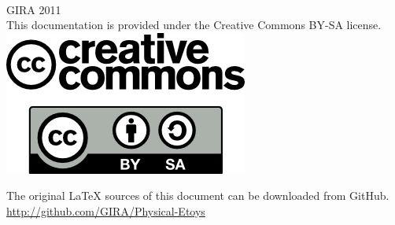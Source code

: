 \documentclass[a4paper,12pt]{article}
\begin{document}
\printglossaries

\clearpage
\thispagestyle{empty}
~
\vfill
\begin{center}
	GIRA 2011\\
	This documentation is provided under the Creative Commons BY-SA license.\\
	\vspace{2cm}
	\includegraphics[scale=0.5]{logo_cc.png}
\end{center}

\vfill

\begin{center}
	The original LaTeX sources of this document can be downloaded from GitHub.
	\url{http://github.com/GIRA/Physical-Etoys}
\end{center}

\vfill
\end{document}
